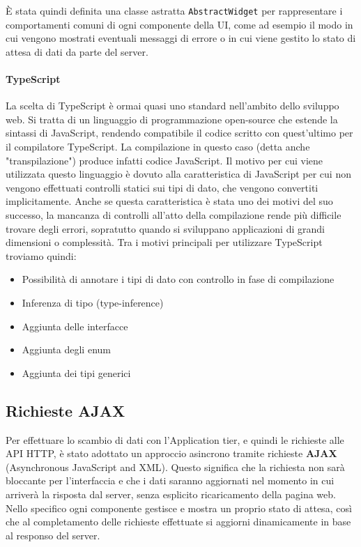 È stata quindi definita una classe astratta \texttt{AbstractWidget} per rappresentare
i comportamenti comuni di ogni componente della UI, come ad esempio il modo in cui
vengono mostrati eventuali messaggi di errore o in cui viene gestito lo stato di
attesa di dati da parte del server.

\paragraph{TypeScript}
La scelta di TypeScript \cite{typescriptlang} è ormai quasi uno standard nell'ambito dello sviluppo web.
Si tratta di un linguaggio di programmazione open-source che estende la sintassi
di JavaScript, rendendo compatibile il codice scritto con quest'ultimo per il
compilatore TypeScript. La compilazione in questo caso (detta anche
"transpilazione") produce infatti codice JavaScript.
Il motivo per cui viene utilizzata questo linguaggio è dovuto alla caratteristica
di JavaScript per cui non vengono effettuati controlli statici sui tipi di dato,
che vengono convertiti implicitamente. Anche se questa caratteristica è stata uno
dei motivi del suo successo, la mancanza di controlli all'atto della compilazione
rende più difficile trovare degli errori, sopratutto quando si sviluppano
applicazioni di grandi dimensioni o complessità.
Tra i motivi principali per utilizzare TypeScript troviamo quindi:
\begin{itemize}
	\item Possibilità di annotare i tipi di dato con controllo in fase di compilazione
	\item Inferenza di tipo (type-inference)
	\item Aggiunta delle interfacce
	\item Aggiunta degli enum
	\item Aggiunta dei tipi generici
\end{itemize}


\subsection{Richieste AJAX}
Per effettuare lo scambio di dati con l'Application tier, e quindi le richieste
alle API HTTP, è stato adottato un approccio asincrono tramite richieste
\textbf{AJAX} (Asynchronous JavaScript and XML). Questo significa che la richiesta
non sarà bloccante per l'interfaccia e che i dati saranno aggiornati nel momento
in cui arriverà la risposta dal server, senza esplicito ricaricamento della pagina
web. Nello specifico ogni componente gestisce e mostra un proprio stato di attesa,
così che al completamento delle richieste effettuate si aggiorni dinamicamente in
base al responso del server.

